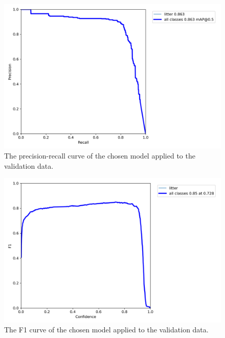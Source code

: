 \documentclass{thesis}
\begin{document}
\begin{figure}[h!]
    \centering
    \includegraphics[scale=0.5]{images/fm-pr-curve.png}
    \caption{The precision-recall curve of the chosen model applied to the validation data.}
    \label{fig:fm-pr-curve}
\end{figure}

\begin{figure}[h!]
    \centering
    \includegraphics[scale=0.5]{images/fm-f1-curve.png}
    \caption{The F1 curve of the chosen model applied to the validation data.}
    \label{fig:fm-f1-curve}
\end{figure}
\end{document}
